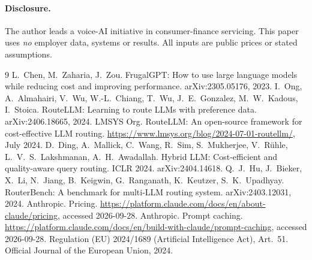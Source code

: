 \documentclass[10pt]{article}
\begin{document}
\paragraph{Disclosure.} The author leads a voice-AI initiative in consumer-finance servicing. This paper uses \emph{no} employer data, systems or results. All inputs are public prices or stated assumptions.

\begin{thebibliography}{9}
 L.~Chen, M.~Zaharia, J.~Zou. FrugalGPT: How to use large language models while reducing cost and improving performance. arXiv:2305.05176, 2023.
 I.~Ong, A.~Almahairi, V.~Wu, W.-L.~Chiang, T.~Wu, J.~E.~Gonzalez, M.~W.~Kadous, I.~Stoica. RouteLLM: Learning to route LLMs with preference data. arXiv:2406.18665, 2024.
 LMSYS Org. RouteLLM: An open-source framework for cost-effective LLM routing. \url{https://www.lmsys.org/blog/2024-07-01-routellm/}, July 2024.
 D.~Ding, A.~Mallick, C.~Wang, R.~Sim, S.~Mukherjee, V.~R\"uhle, L.~V.~S.~Lakshmanan, A.~H.~Awadallah. Hybrid LLM: Cost-efficient and quality-aware query routing. ICLR 2024. arXiv:2404.14618.
 Q.~J.~Hu, J.~Bieker, X.~Li, N.~Jiang, B.~Keigwin, G.~Ranganath, K.~Keutzer, S.~K.~Upadhyay. RouterBench: A benchmark for multi-LLM routing system. arXiv:2403.12031, 2024.
 Anthropic. Pricing. \url{https://platform.claude.com/docs/en/about-claude/pricing}, accessed 2026-09-28.
 Anthropic. Prompt caching. \url{https://platform.claude.com/docs/en/build-with-claude/prompt-caching}, accessed 2026-09-28.
 Regulation (EU) 2024/1689 (Artificial Intelligence Act), Art.~51. Official Journal of the European Union, 2024.
\end{thebibliography}
\end{document}
